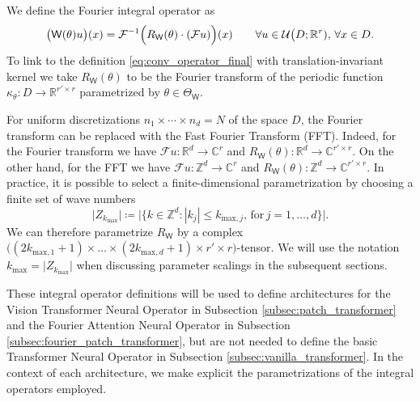 \documentclass[twoside]{article}
\newcommand{\1}{\mathbbm{1}}
\newcommand{\R}{\mathbbm{R}}
\newcommand{\Z}{\mathbbm{Z}}
\newcommand{\C}{\mathbbm{C}}
\newcommand{\cU}{\mathcal{U}}
\newcommand{\sW}{\mathsf{W}}
\newcommand{\cF}{\mathcal{F}}
\newcommand{\ml}[1]{{\color{cyan}{#1}}}
\providecommand{\mathbbm}{\mathbb} %
\begin{document}
\begin{definition}[Fourier Integral Operator $\sW$]
\label{def:FourierIntegralOperator_final}
We define the Fourier integral operator as 
    \begin{equation}
        \bigl(\sW(\theta){u} \bigr)(x) = \cF^{-1}\Bigl(R_\sW(\theta) \cdot (\cF{u}) \Bigr)(x)\qquad \forall u\in \cU\bigl(D;\R^r),\,\forall x\in D.
    \end{equation}
    To link to the definition \eqref{eq:conv_operator_final} with translation-invariant kernel
we take $R_{\sW}(\theta)$ to be the Fourier transform of the periodic function ${\kappa_\theta}:D\to \R^{{r'}\times r}$ parametrized by $\theta \in \Theta_{\sW}$.
    \end{definition}
For uniform discretizations $n_1\times\cdots\times n_d=N$ of the space $D$, the Fourier transform can be replaced with the Fast Fourier Transform (FFT).
Indeed, for the Fourier transform we have %
$\cF u : \R^d \to \C^r$ and $R_\sW(\theta) : \R^d \to \C^{r' \times r}$.
On the other hand, for the FFT we have
$\cF u : \Z^d \to \C^r$ and $R_\sW(\theta) : \Z^d \to \C^{r' \times r}$. In practice, it is possible to select a finite-dimensional parametrization by choosing a finite set of wave numbers 
\[
\bigl|Z_{k_{\textrm{max}}} \bigr|\coloneqq\bigl|\bigl\{ 
k\in\Z^d: |k_j|\leq k_{\textrm{max},j},\, \text{for}\,j=1,\ldots,d
\bigr\} \bigr|.
\] We can therefore parametrize $R_{\sW}$ by a complex $\bigl((2k_{\text{max},1}+1)\times \ldots\times (2k_{\text{max},d}+1) \times r'\times r\bigr)$-tensor. We will use the notation $k_{\textrm{max}}=\bigl|Z_{k_{\textrm{max}}} \bigr|$ when discussing parameter scalings in the subsequent sections.

These integral operator definitions will be used to define architectures for the Vision Transformer Neural Operator in Subsection \ref{subsec:patch_transformer} and the Fourier Attention Neural Operator in Subsection \ref{subsec:fourier_patch_transformer}, but are not needed to define the basic Transformer Neural Operator in Subsection \ref{subsec:vanilla_transformer}. In the context of each architecture, we make explicit the parametrizations of the integral operators employed.

\end{document}
